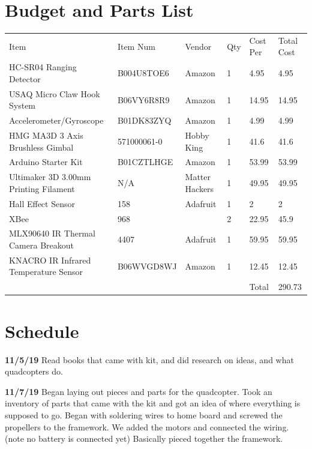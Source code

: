\clearpage

\section{Budget and Parts List}

\begin{table}[!htbp]
\begin{tabular}{llllll}
Item                                  & Item Num    & Vendor         & Qty & Cost Per & Total Cost \\
HC-SR04 Ranging Detector              & B004U8TOE6  & Amazon         & 1   & 4.95     & 4.95       \\
USAQ Micro Claw Hook System           & B06VY6R8R9  & Amazon         & 1   & 14.95    & 14.95      \\
Accelerometer/Gyroscope               & B01DK83ZYQ  & Amazon         & 1   & 4.99     & 4.99       \\
HMG MA3D 3 Axis Brushless Gimbal      & 571000061-0 & Hobby King     & 1   & 41.6     & 41.6       \\
Arduino Starter Kit                   & B01CZTLHGE  & Amazon         & 1   & 53.99    & 53.99      \\
Ultimaker 3D 3.00mm Printing Filament & N/A         & Matter Hackers & 1   & 49.95    & 49.95      \\
Hall Effect Sensor                    & 158         & Adafruit       & 1   & 2        & 2          \\
XBee                                  & 968         &                & 2   & 22.95    & 45.9       \\
MLX90640 IR Thermal Camera Breakout   & 4407        & Adafruit       & 1   & 59.95    & 59.95      \\
KNACRO IR Infrared Temperature Sensor & B06WVGD8WJ  & Amazon         & 1   & 12.45    & 12.45      \\
                                      &             &                &     & Total    & 290.73    
\end{tabular}
\end{table}

\section{Schedule}

\textbf{11/5/19}    Read books that came with kit, and did research on ideas, and what quadcopters do.

\textbf{11/7/19}    Began laying out pieces and parts for the quadcopter. Took an inventory of parts that came with the kit and got an idea of where everything is supposed to go. Began with soldering wires to home board and screwed the propellers to the framework. We added the motors and connected the wiring. (note no battery is connected yet) Basically pieced together the framework.

